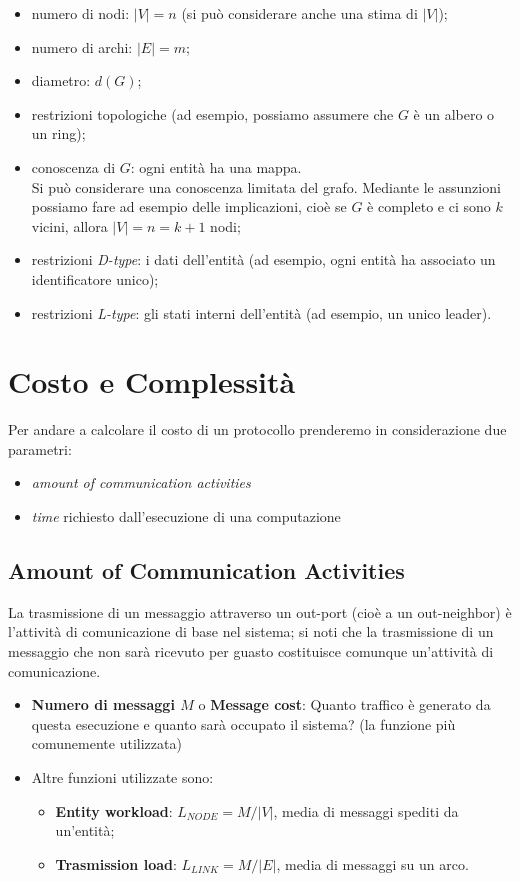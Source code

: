 \begin{itemize}
    \item numero di nodi: $|V| = n$ (si può considerare anche una stima di $|V|$);
    \item numero di archi: $|E| = m$;
    \item diametro: $d(G)$;
    \item restrizioni topologiche (ad esempio, possiamo assumere che $G$ è un
          albero o un ring);
    \item conoscenza di $G$: ogni entità ha una mappa. \\ Si può considerare una
          conoscenza limitata del grafo. Mediante le assunzioni possiamo fare ad esempio
          delle implicazioni, cioè se $G$ è completo e ci sono $k$ vicini, allora $|V| =
              n = k+1$ nodi;
    \item restrizioni \textit{D-type}: i dati dell'entità (ad esempio, ogni entità
          ha associato un identificatore unico);
    \item restrizioni \textit{L-type}: gli stati interni dell'entità (ad esempio,
          un unico leader).
\end{itemize}

\section{Costo e Complessità}
Per andare a calcolare il costo di un protocollo prenderemo in considerazione
due parametri:

\begin{itemize}
    \item \textit{amount of communication activities}
    \item \textit{time} richiesto dall'esecuzione di una computazione
\end{itemize}

\subsection{Amount of Communication Activities}
La trasmissione di un messaggio attraverso un out-port (cioè a un out-neighbor)
è l'attività di comunicazione di base nel sistema; si noti che la trasmissione
di un messaggio che non sarà ricevuto per guasto costituisce comunque
un'attività di comunicazione.

\begin{itemize}
    \item \textbf{Numero di messaggi $M$} o \textbf{Message cost}: Quanto traffico
          è generato da questa esecuzione e quanto sarà occupato il sistema? (la
          funzione più comunemente utilizzata)
    \item Altre funzioni utilizzate sono:
          \begin{itemize}
              \item \textbf{Entity workload}: $L_{NODE} = M / |V|$, media di
                    messaggi spediti da un'entità;
              \item \textbf{Trasmission load}: $L_{LINK} = M / |E|$, media di
                    messaggi su un arco.
          \end{itemize}
\end{itemize}


